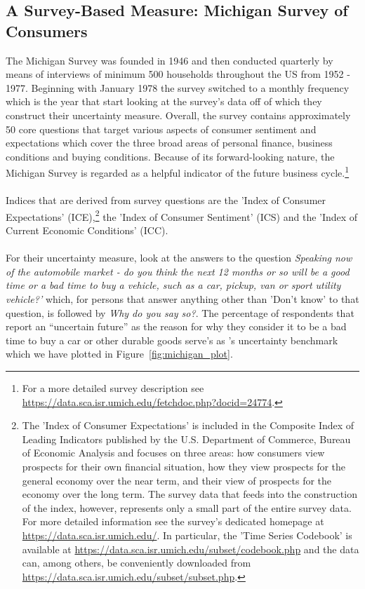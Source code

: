 \documentclass[a4paper,11pt,listof=nochaptergap,oneside,pointednumbers,bibtotoc,bigheadings,liststotoc]{scrbook}
\theoremstyle{mysatz}
\theoremstyle{mydefinition}
\theoremstyle{mybemerkung}
\begin{document}
\subsection{A Survey-Based Measure: Michigan Survey of Consumers}
\label{sec:michigansurvey}

The Michigan Survey was founded in 1946 and then conducted quarterly by means of interviews of minimum 500 households throughout the US from 1952 - 1977. Beginning with January 1978 the survey switched to a monthly frequency which is the year that \citet{leducandliu:16} start looking at the survey's data off of which they construct their uncertainty measure. Overall, the survey contains approximately 50 core questions that target various aspects of consumer sentiment and expectations which cover the three broad areas of personal finance, business conditions and buying conditions. Because of its forward-looking nature, the Michigan Survey is regarded as a helpful indicator of the future business cycle.\footnote{For a more detailed survey description see \url{https://data.sca.isr.umich.edu/fetchdoc.php?docid=24774}.}\\
\\
Indices that are derived from survey questions are the 'Index of Consumer Expectations' (ICE),\footnote{The 'Index of Consumer Expectations' is included in the Composite Index of Leading Indicators published by the U.S. Department of Commerce, Bureau of Economic Analysis and focuses on three areas: how consumers view prospects for their own financial situation, how they view prospects for the general economy over the near term, and their view of prospects for the economy over the long term. The survey data that feeds into the construction of the index, however, represents only a small part of the entire survey data. For more detailed information see the survey's dedicated homepage at \url{https://data.sca.isr.umich.edu/}. In particular, the 'Time Series Codebook' is available at \url{https://data.sca.isr.umich.edu/subset/codebook.php} and the data can, among others, be conveniently downloaded from \url{https://data.sca.isr.umich.edu/subset/subset.php}.} the 'Index of Consumer Sentiment' (ICS) and the 'Index of Current Economic Conditions' (ICC).\\
\\
For their uncertainty measure, \citet{leducandliu:16} look at the answers to the question \textit{Speaking now of the automobile market - do you think the next 12 months or so will be a good time or a bad time to buy a vehicle, such as a car, pickup, van or sport utility vehicle?'} which, for persons that answer anything other than 'Don't know' to that question, is followed by \textit{Why do you say so?}. The percentage of respondents that report an ``uncertain future'' as the reason for why they consider it to be a bad time to buy a car or other durable goods serve's as \citet{leducandliu:16}'s uncertainty benchmark which we have plotted in Figure~\ref{fig:michigan_plot}.
\end{document}
